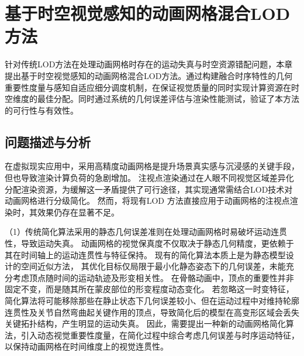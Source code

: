 \chapter{基于时空视觉感知的动画网格混合LOD方法}
针对传统LOD方法在处理动画网格时存在的运动失真与时空资源错配问题，本章提出基于时空视觉感知的动画网格混合LOD方法。通过构建融合时序特性的几何重要性度量与感知自适应细分调度机制，在保证视觉质量的同时实现计算资源在时空维度的最佳分配。同时通过系统的几何误差评估与渲染性能测试，验证了本方法的可行性与有效性。

\section{问题描述与分析}

在虚拟现实应用中，采用高精度动画网格是提升场景真实感与沉浸感的关键手段，但也导致渲染计算负荷的急剧增加。
注视点渲染通过在人眼不同视觉区域差异化分配渲染资源，为缓解这一矛盾提供了可行途径，其实现通常需结合LOD技术对动画网格进行分级简化。
然而，将现有LOD 方法直接应用于动画网格的注视点渲染时，其效果仍存在显著不足。






（1）传统简化算法采用的静态几何误差准则在处理动画网格时易破坏运动连贯性，导致运动失真。
动画网格的视觉保真度不仅取决于静态几何精度，更依赖于其在时间轴上的运动连贯性与特征保持。
现有的简化算法本质上是为静态模型设计的空间近似方法，
其优化目标仅局限于最小化静态姿态下的几何误差，未能充分考虑顶点随时间的运动轨迹及形变相关性。
在骨骼动画中，顶点的重要性并非固定不变，而是随其所在蒙皮部位的形变程度动态变化。
若忽略这一时变特征，简化算法将可能移除那些在静止状态下几何误差较小、但在运动过程中对维持轮廓连贯性及关节自然弯曲起关键作用的顶点，导致简化后的模型在高变形区域会丢失关键拓扑结构，产生明显的运动失真。
因此，需要提出一种新的动画网格简化算法，引入动态视觉重要性度量，在简化过程中综合考虑几何误差与时序运动特征，以保持动画网格在时间维度上的视觉连贯性。


